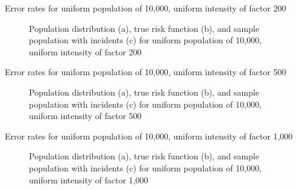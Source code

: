 \begin{table}[H]

\caption[]{Error rates for uniform population of 10,000, uniform intensity of factor 200}
\label{tbl:mean_error_rates:unif_200_unif}
\end{table}

\begin{figure}[H]
    
    \caption[]{Population distribution (a), true risk function (b), and sample population with incidents (c) for uniform population of 10,000, uniform intensity of factor 200}
    \label{fig:distributions:unif_200_unif}    
\end{figure}


\graphicspath{{./results/unif_500_unif/}}
\makeatletter
{}
\makeatother

\begin{table}[H]

\caption[]{Error rates for uniform population of 10,000, uniform intensity of factor 500}
\label{tbl:mean_error_rates:unif_500_unif}
\end{table}

\begin{figure}[H]
    
    \caption[]{Population distribution (a), true risk function (b), and sample population with incidents (c) for uniform population of 10,000, uniform intensity of factor 500}
    \label{fig:distributions:unif_500_unif}    
\end{figure}


\graphicspath{{./results/unif_1000_unif/}}
\makeatletter
{}
\makeatother

\begin{table}[H]

\caption[]{Error rates for uniform population of 10,000, uniform intensity of factor 1,000}
\label{tbl:mean_error_rates:unif_1000_unif}
\end{table}

\begin{figure}[H]
    
    \caption[]{Population distribution (a), true risk function (b), and sample population with incidents (c) for uniform population of 10,000, uniform intensity of factor 1,000}
    \label{fig:distributions:unif_1000_unif}    
\end{figure}



